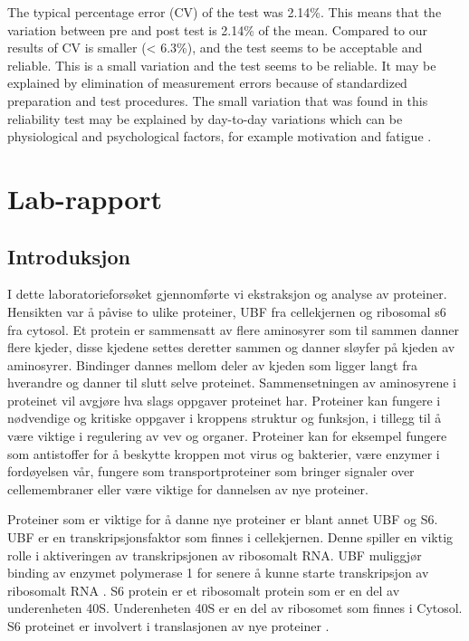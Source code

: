 \documentclass[
]{book}
\begin{document}
The typical percentage error (CV) of the test was 2.14\%. This means that the variation between pre and post test is 2.14\% of the mean. Compared to \citet{schroeder2007} our results of CV is smaller (\textless{} 6.3\%), and the test seems to be acceptable and reliable. This is a small variation and the test seems to be reliable. It may be explained by elimination of measurement errors because of standardized preparation and test procedures. The small variation that was found in this reliability test may be explained by day-to-day variations which can be physiological and psychological factors, for example motivation and fatigue \citep{schroeder2007}.

\hypertarget{lab-rapport}{%
\chapter{Lab-rapport}\label{lab-rapport}}

\hypertarget{introduksjon}{%
\section{Introduksjon}\label{introduksjon}}

I dette laboratorieforsøket gjennomførte vi ekstraksjon og analyse av proteiner. Hensikten var å påvise to ulike proteiner, UBF fra cellekjernen og ribosomal s6 fra cytosol. Et protein er sammensatt av flere aminosyrer som til sammen danner flere kjeder, disse kjedene settes deretter sammen og danner sløyfer på kjeden av aminosyrer. Bindinger dannes mellom deler av kjeden som ligger langt fra hverandre og danner til slutt selve proteinet. Sammensetningen av aminosyrene i proteinet vil avgjøre hva slags oppgaver proteinet har. Proteiner kan fungere i nødvendige og kritiske oppgaver i kroppens struktur og funksjon, i tillegg til å være viktige i regulering av vev og organer. Proteiner kan for eksempel fungere som antistoffer for å beskytte kroppen mot virus og bakterier, være enzymer i fordøyelsen vår, fungere som transportproteiner som bringer signaler over cellemembraner \citep{alberts2015} eller være viktige for dannelsen av nye proteiner.

Proteiner som er viktige for å danne nye proteiner er blant annet UBF og S6. UBF er en transkripsjonsfaktor som finnes i cellekjernen. Denne spiller en viktig rolle i aktiveringen av transkripsjonen av ribosomalt RNA. UBF muliggjør binding av enzymet polymerase 1 for senere å kunne starte transkripsjon av ribosomalt RNA \citep{copenhaver1994}. S6 protein er et ribosomalt protein som er en del av underenheten 40S. Underenheten 40S er en del av ribosomet som finnes i Cytosol. S6 proteinet er involvert i translasjonen av nye proteiner \citep{puighermanal2017}.
\end{document}
